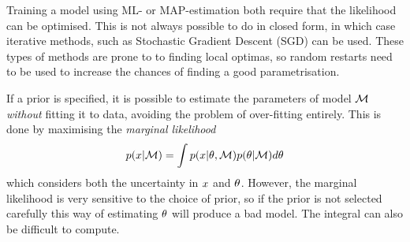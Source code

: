 Training a model using ML- or MAP-estimation both require that the
likelihood can be optimised. This is not always possible to do in
closed form, in which case iterative methods, such as Stochastic
Gradient Descent (SGD) can be used. These types of methods are
prone to to finding local optimas, so random restarts need to be used
to increase the chances of finding a good parametrisation.

If a prior is specified, it is possible to estimate the parameters of
model $\mathcal{M}$ \textit{without} fitting it to data, avoiding the
problem of over-fitting entirely. This is done by maximising the
\textit{marginal likelihood}
\begin{equation}
  \label{eq:marginal-likelihood}
  p(x \vert \mathcal{M}) = 
  \int p(x \vert \theta,\mathcal{M}) p(\theta \vert \mathcal{M}) d\theta
\end{equation}
which considers both the uncertainty in $x$ and
$\theta$. However, the marginal likelihood is very sensitive to
the choice of prior, so if the prior is not selected carefully this
way of estimating $\theta$ will produce a bad model. The integral
can also be difficult to compute.

